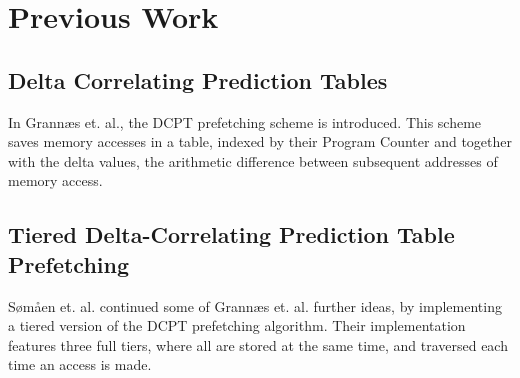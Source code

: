 \section{Previous Work}

\subsection{Delta Correlating Prediction Tables}
In Grannæs et. al.\cite{Grannaes481837}, the DCPT prefetching scheme is
introduced. This scheme saves memory accesses in a table, indexed by their
Program Counter and together with the delta values, the arithmetic difference
between subsequent addresses of memory access. 

\subsection{Tiered Delta-Correlating Prediction Table Prefetching}
Sømåen et. al.\cite{Somaen} continued some of Grannæs et. al. further ideas, by
implementing a tiered version of the DCPT prefetching algorithm. Their
implementation features three full tiers, where all are stored at the same time,
and traversed each time an access is made.


